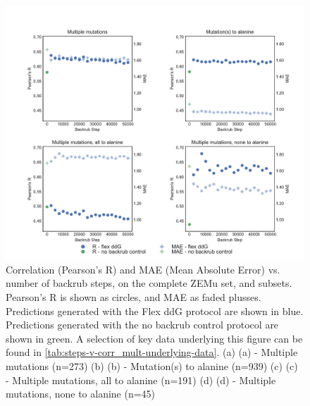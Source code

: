 \begin{figure}
  \includegraphics[width=\textwidth,keepaspectratio]{steps-v-corr_mult.pdf}
  \caption[Flex ddG performance vs. number of backrub steps]{
    Correlation (Pearson's R) and MAE (Mean Absolute Error) vs. number of backrub steps, on the complete ZEMu set, and subsets.
    Pearson's R is shown as circles, and MAE as faded plusses.
Predictions generated with the Flex ddG protocol are shown in blue.
Predictions generated with the no backrub control protocol are shown in green.
    A selection of key data underlying this figure can be found in \cref{tab:steps-v-corr_mult-underlying-data}.
    (a) (a) - Multiple mutations (n=273)
    (b) (b) - Mutation(s) to alanine (n=939)
    (c) (c) - Multiple mutations, all to alanine (n=191)
    (d) (d) - Multiple mutations, none to alanine (n=45)
  } \label{fig:steps-v-corr_mult}
\end{figure}
